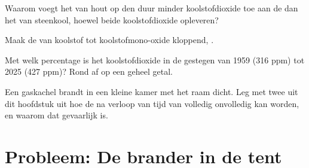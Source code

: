 \begin{exercise}[$\star\star$]\label{exo:g8:combustion-and-fuels:9}
Waarom voegt het  van hout op den duur minder koolstofdioxide
toe aan de  dan het  van steenkool, hoewel beide
koolstofdioxide opleveren?
\end{exercise}

\begin{exercise}[$\star\star$]\label{exo:g8:combustion-and-fuels:10}
Maak de  van koolstof tot koolstofmono-oxide
kloppend, . %
\end{exercise}

\begin{exercise}[$\star\star\star$]\label{exo:g8:combustion-and-fuels:11}
Met welk percentage is het koolstofdioxide in de  gestegen van 1959
(316 ppm) tot 2025 (427 ppm)? Rond af op een geheel getal.
\end{exercise}

\begin{exercise}[$\star\star\star$]\label{exo:g8:combustion-and-fuels:12}
Een gaskachel brandt in een kleine kamer met het raam dicht. Leg met
twee  uit dit hoofdstuk uit hoe de  na
verloop van tijd van volledig onvolledig kan worden, en waarom dat
gevaarlijk is.
\end{exercise}

\section{Probleem: De brander in de tent}

